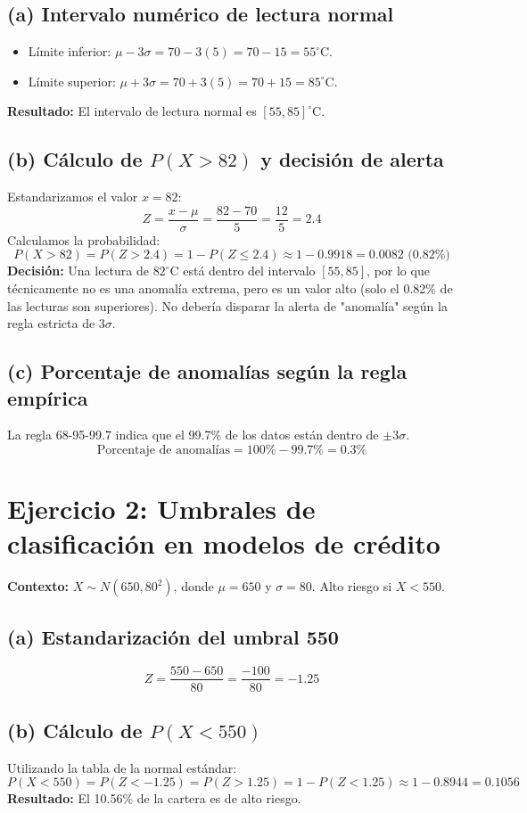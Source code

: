 \documentclass[a4paper,12pt]{article}
\begin{document}
\subsection{(a) Intervalo numérico de lectura normal}
\begin{itemize}
    \item Límite inferior: $\mu - 3\sigma = 70 - 3(5) = 70 - 15 = 55^\circ$C.
    \item Límite superior: $\mu + 3\sigma = 70 + 3(5) = 70 + 15 = 85^\circ$C.
\end{itemize}
\textbf{Resultado:} El intervalo de lectura normal es $[55, 85]^\circ$C.

\subsection{(b) Cálculo de $P(X > 82)$ y decisión de alerta}
Estandarizamos el valor $x = 82$:
\[ Z = \frac{x - \mu}{\sigma} = \frac{82 - 70}{5} = \frac{12}{5} = 2.4 \]
Calculamos la probabilidad:
\[ P(X > 82) = P(Z > 2.4) = 1 - P(Z \leq 2.4) \approx 1 - 0.9918 = 0.0082 \text{ (0.82\%)} \]
\textbf{Decisión:} Una lectura de $82^\circ$C está dentro del intervalo $[55, 85]$, por lo que técnicamente no es una anomalía extrema, pero es un valor alto (solo el 0.82\% de las lecturas son superiores). No debería disparar la alerta de "anomalía" según la regla estricta de $3\sigma$.

\subsection{(c) Porcentaje de anomalías según la regla empírica}
La regla 68-95-99.7 indica que el 99.7\% de los datos están dentro de $\pm 3\sigma$.
\[ \text{Porcentaje de anomalías} = 100\% - 99.7\% = 0.3\% \]

\newpage

\section{Ejercicio 2: Umbrales de clasificación en modelos de crédito}
\textbf{Contexto:} $X \sim N(650, 80^2)$, donde $\mu = 650$ y $\sigma = 80$. Alto riesgo si $X < 550$.

\subsection{(a) Estandarización del umbral 550}
\[ Z = \frac{550 - 650}{80} = \frac{-100}{80} = -1.25 \]

\subsection{(b) Cálculo de $P(X < 550)$}
Utilizando la tabla de la normal estándar:
\[ P(X < 550) = P(Z < -1.25) = P(Z > 1.25) = 1 - P(Z < 1.25) \approx 1 - 0.8944 = 0.1056 \]
\textbf{Resultado:} El 10.56\% de la cartera es de alto riesgo.
\end{document}
